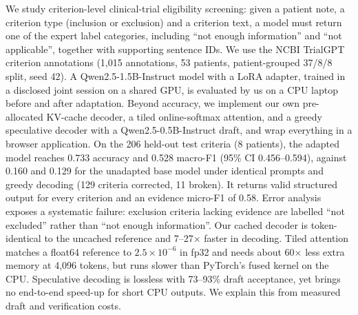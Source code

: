 We study criterion-level clinical-trial eligibility screening: given a patient note, a criterion type (inclusion or exclusion) and a criterion text, a model must return one of the expert label categories, including ``not enough information'' and ``not applicable'', together with supporting sentence IDs. We use the NCBI TrialGPT criterion annotations (1{,}015 annotations, 53 patients, patient-grouped 37/8/8 split, seed 42). A Qwen2.5-1.5B-Instruct model with a LoRA adapter, trained in a disclosed joint session on a shared GPU, is evaluated by us on a CPU laptop before and after adaptation. Beyond accuracy, we implement our own pre-allocated KV-cache decoder, a tiled online-softmax attention, and a greedy speculative decoder with a Qwen2.5-0.5B-Instruct draft, and wrap everything in a browser application. On the 206 held-out test criteria (8 patients), the adapted model reaches 0.733 accuracy and 0.528 macro-F1 (95\% CI 0.456--0.594), against 0.160 and 0.129 for the unadapted base model under identical prompts and greedy decoding (129 criteria corrected, 11 broken). It returns valid structured output for every criterion and an evidence micro-F1 of 0.58. Error analysis exposes a systematic failure: exclusion criteria lacking evidence are labelled ``not excluded'' rather than ``not enough information''. Our cached decoder is token-identical to the uncached reference and 7--27$\times$ faster in decoding. Tiled attention matches a float64 reference to $2.5\times10^{-6}$ in fp32 and needs about 60$\times$ less extra memory at 4{,}096 tokens, but runs slower than PyTorch's fused kernel on the CPU. Speculative decoding is lossless with 73--93\% draft acceptance, yet brings no end-to-end speed-up for short CPU outputs. We explain this from measured draft and verification costs.